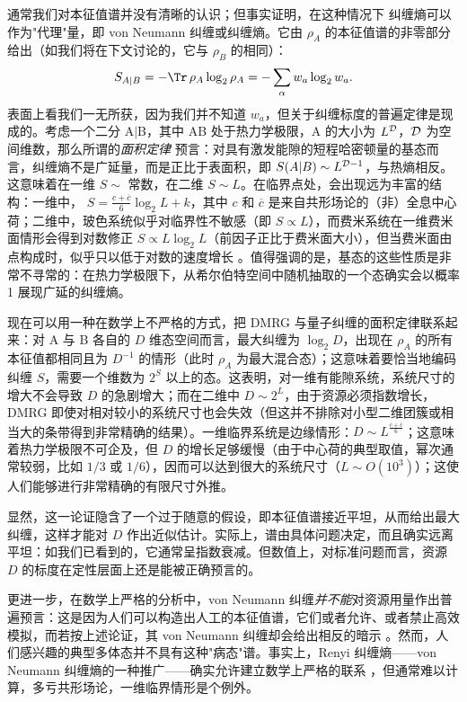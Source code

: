 通常我们对本征值谱并没有清晰的认识；但事实证明，在这种情况下
纠缠熵可以作为"代理"量，即 von Neumann 纠缠或纠缠熵。它由 $\rho_A$ 的本征值谱的非零部分给出（如我们将在下文讨论的，它与 $\rho_B$ 的相同）：
\begin{equation}
S_{A|B}  = - \Tr\, \rho_A \log_2 \rho_A = - \sum_\alpha w_a \log_2 w_a .
\end{equation}
表面上看我们一无所获，因为我们并不知道 $w_a$，但关于纠缠标度的普遍定律是现成的。考虑一个二分 A$|$B，其中 AB 处于热力学极限，A 的大小为 $L^{\cal D}$，${\cal D}$ 为空间维数，那么所谓的{\em 面积定律}
\cite{Eisert10,Bekenstein73,Srednicki93,Callan94,Plenio05} 预言：对具有激发能隙的短程哈密顿量的基态而言，纠缠熵不是广延量，而是正比于表面积，即 $S(A|B) \sim L^{{\cal D}-1}$，与热熵相反。这意味着在一维 $S \sim $ 常数，在二维 $S \sim L$。在临界点处，会出现远为丰富的结构：一维中，
$S = \frac{c+\overline{c}}{6} \log_2 L + k$，其中 $c$ 和 $\overline{c}$ 是来自共形场论的（非）全息中心荷\cite{Vidal03,Latorre04}；二维中，玻色系统似乎对临界性不敏感（即 $S \propto L$）\cite{Srednicki93,Barthel06}，而费米系统在一维费米面情形会得到对数修正 $S \propto L \log_2 L$（前因子正比于费米面大小），但当费米面由点构成时，似乎只以低于对数的速度增长 \cite{Barthel06,Gioev06}。值得强调的是，基态的这些性质是非常不寻常的：在热力学极限下，从希尔伯特空间中随机抽取的一个态确实会以概率 1 展现广延的纠缠熵。

现在可以用一种在数学上不严格的方式，把 DMRG 与量子纠缠的面积定律联系起来：对 A 与 B 各自的 $D$ 维态空间而言，最大纠缠为 $\log_2 D$，出现在 $\rho_A$ 的所有本征值都相同且为 $D^{-1}$ 的情形（此时 $\rho_A$ 为最大混合态）；这意味着要恰当地编码纠缠 $S$，需要一个维数为 $2^S$ 以上的态。这表明，对一维有能隙系统，系统尺寸的增大不会导致 $D$ 的急剧增大；而在二维中 $D \sim 2^L$，由于资源必须指数增长，DMRG 即使对相对较小的系统尺寸也会失效（但这并不排除对小型二维团簇或相当大的条带得到非常精确的结果）。一维临界系统是边缘情形：$D \sim L^{\frac{c+\overline{c}}{6}}$；这意味着热力学极限不可企及，但 $D$ 的增长足够缓慢（由于中心荷的典型取值，幂次通常较弱，比如 $1/3$ 或 $1/6$），因而可以达到很大的系统尺寸（$L \sim O(10^3)$）；这使人们能够进行非常精确的有限尺寸外推。

显然，这一论证隐含了一个过于随意的假设，即本征值谱接近平坦，从而给出最大纠缠，这样才能对 $D$ 作出近似估计。实际上，谱由具体问题决定，而且确实远离平坦：如我们已看到的，它通常呈指数衰减。但数值上，对标准问题而言，资源 $D$ 的标度在定性层面上还是能被正确预言的。

更进一步，在数学上严格的分析中，von Neumann 纠缠{\em 并不能}对资源用量作出普遍预言：这是因为人们可以构造出人工的本征值谱，它们或者允许、或者禁止高效模拟，而若按上述论证，其 von Neumann 纠缠却会给出相反的暗示 \cite{Schuch08}。然而，人们感兴趣的典型多体态并不具有这种"病态"谱。事实上，Renyi 纠缠熵——von Neumann 纠缠熵的一种推广——确实允许建立数学上严格的联系 \cite{Schuch08}，但通常难以计算，多亏共形场论，一维临界情形是个例外。

